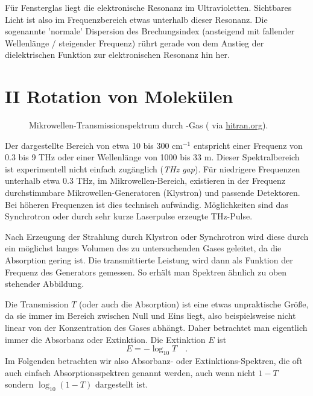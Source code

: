 Für Fensterglas liegt die elektronische Resonanz im Ultravioletten. Sichtbares Licht ist also im Frequenzbereich etwas unterhalb dieser Resonanz. Die sogenannte 'normale' Dispersion des Brechungsindex (ansteigend mit fallender Wellenlänge / steigender Frequenz) rührt gerade von dem Anstieg der dielektrischen Funktion zur elektronischen Resonanz hin her.





\section{II Rotation von Molekülen}




\begin{figure}
\caption{Mikrowellen-Transmissionspektrum durch  -Gas  (\cite{Li_2011_hcl} via \href{https://hitran.org}{hitran.org}).
\label{fig:rot_hcl}}
\end{figure}




Der dargestellte Bereich  von etwa 10 bis 300 cm$^{-1}$ entspricht einer Frequenz von 0.3 bis 9 THz oder einer Wellenlänge von 1000 bis 33 \textmu m. Dieser Spektralbereich ist experimentell nicht einfach zugänglich (\emph{THz gap}). Für niedrigere Frequenzen unterhalb etwa 0.3 THz, im Mikrowellen-Bereich, existieren in der Frequenz durchstimmbare  Mikrowellen-Generatoren (Klystron) und passende Detektoren. Bei höheren Frequenzen ist dies technisch aufwändig. Möglichkeiten sind das Synchrotron oder durch sehr kurze Laserpulse erzeugte THz-Pulse.

Nach Erzeugung der Strahlung durch Klystron oder Synchrotron wird diese durch ein möglichst langes Volumen des zu untersuchenden Gases geleitet, da die Absorption gering ist. Die transmittierte Leistung wird dann als Funktion der Frequenz des Generators gemessen. So erhält man  Spektren ähnlich zu oben stehender Abbildung.

Die Transmission $T$ (oder auch die Absorption) ist eine etwas unpraktische Größe, da sie immer im Bereich zwischen Null und Eins liegt, also beispielsweise nicht linear von der Konzentration des Gases abhängt. Daher betrachtet man eigentlich immer die Absorbanz oder Extinktion. Die Extinktion $E$ ist
%
\begin{equation}
 E = - \log_{10} T \quad .
\end{equation}
%
Im Folgenden betrachten wir also Absorbanz- oder Extinktions-Spektren, die oft auch einfach Absorptionsspektren genannt werden, auch wenn nicht $1-T$ sondern $\log_{10} ( 1- T)$ dargestellt ist.

